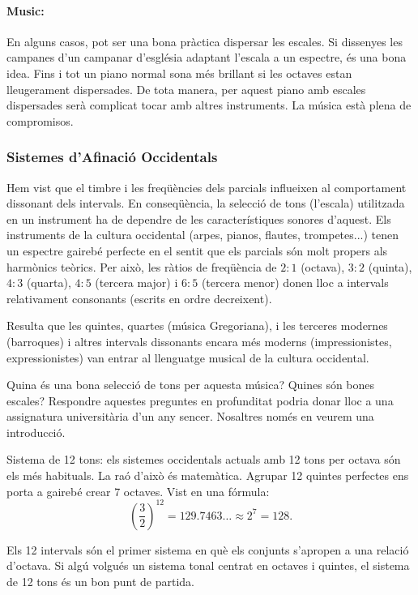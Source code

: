 \paragraph{Music:}
En alguns casos, pot ser una bona pràctica dispersar les escales. Si dissenyes les campanes d'un campanar d'església adaptant l'escala a un espectre, és una bona idea. Fins i tot un piano normal sona més brillant si les octaves estan lleugerament dispersades. De tota manera, per aquest piano amb escales dispersades serà complicat tocar amb altres instruments. La música està plena de compromisos.

\subsubsection{Sistemes d'Afinació Occidentals}
Hem vist que el timbre i les freqüències dels parcials influeixen al comportament dissonant dels intervals. En conseqüència, la selecció de tons (l'escala) utilitzada en un instrument ha de dependre de les característiques sonores d'aquest. Els instruments de la cultura occidental (arpes, pianos, flautes, trompetes...) tenen un espectre gairebé perfecte en el sentit que els parcials són molt propers als harmònics teòrics. Per això, les ràtios de freqüència de $2 : 1$ (octava), $3 : 2$ (quinta), $4 : 3$ (quarta), $4 : 5$ (tercera major) i $6 : 5$ (tercera menor) donen lloc a intervals relativament consonants (escrits en ordre decreixent).

Resulta que les quintes, quartes (música Gregoriana), i les terceres modernes (barroques) i altres intervals dissonants encara més moderns (impressionistes, expressionistes) van entrar al llenguatge musical de la cultura occidental.

Quina és una bona selecció de tons per aquesta música? Quines són bones escales? Respondre aquestes preguntes en profunditat podria donar lloc a una assignatura universitària d'un any sencer. Nosaltres només  en veurem una introducció.

Sistema de 12 tons: els sistemes occidentals actuals amb 12 tons per octava són els més habituals. La raó d'això és matemàtica. Agrupar 12 quintes perfectes ens porta a gairebé crear 7 octaves. Vist en una fórmula:
$$\left( \frac{3}{2}\right)^{12} = 129.7463 \ldots \approx 2^7 = 128 .$$

Els 12 intervals són el primer sistema en què els conjunts s'apropen a una relació d'octava. Si algú volgués un sistema tonal centrat en octaves i quintes, el sistema de 12 tons és un bon punt de partida.


